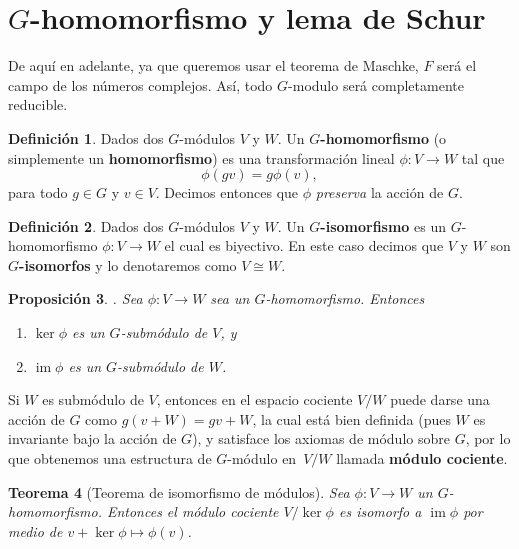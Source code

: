 \documentclass[12pt]{book}
\newtheorem{theorem}{Teorema}[section]
\newtheorem{proposition}[theorem]{Proposición}
\theoremstyle{definition}
\newtheorem{definition}[theorem]{Definición}
\DeclareMathOperator{\im}{im}
\newcounter{in}
\newcounter{ini}
\begin{document}
\section{$G$-homomorfismo y lema de Schur} 
\label{schur}

De aquí en adelante, ya que queremos usar el teorema de Maschke,
$F$ será el campo de los números complejos. Así, todo $G$-modulo será
completamente reducible.

\begin{definition}
  Dados dos $G$-módulos $V$ y $W$. Un $G$\textbf{-homomorfismo} (o simplemente
  un \textbf{homomorfismo}) es una transformación lineal $\phi:V\rightarrow
  W$ tal que
  \begin{equation*}
    \phi(gv)=g\phi(v),
  \end{equation*}
para todo $g\in G$ y $v\in V$. Decimos entonces que $\phi$ \emph{preserva} la acción
de $G$.
\end{definition}

\begin{definition}
  Dados dos $G$-módulos $V$ y $W$. Un $G$\textbf{-isomorfismo} es un
  $G$-homomorfismo $\phi:V\rightarrow W$ el cual es biyectivo. En
  este caso decimos que $V$ y $W$ son $G$\textbf{-isomorfos} y lo
  denotaremos como $V\cong W$.
\end{definition}

\begin{proposition}{}.
  \label{ker-im-sub}
  Sea $\phi:V\rightarrow W$ sea un $G$-homomorfismo. Entonces
  \begin{enumerate}
  \item $\ker\phi$ es un $G$-submódulo de $V$, y
  \item $\im\phi$ es un $G$-submódulo de $W$.
  \end{enumerate}
\end{proposition}  
Si $W$ es submódulo de $V$, entonces en el espacio cociente
$V/W$ puede darse una acción de $G$ como $g(v+W)=gv+W$, la cual está
bien definida (pues $W$ es invariante bajo la acción de $G$), y
satisface los axiomas de módulo sobre $G$, por lo que obtenemos una
estructura de $G$-módulo en~$V/W$ llamada \textbf{módulo cociente}.

\begin{theorem}[Teorema de isomorfismo de módulos]
  \label{teorema-isomorfismo-mod}
  Sea $\phi:V\rightarrow W$ un $G$-homomorfismo. Entonces el
  módulo cociente $V/\ker\phi$ es isomorfo a $\im\phi$ por medio de
  $v+\ker\phi\mapsto\phi(v)$.
\end{theorem}
\end{document}
